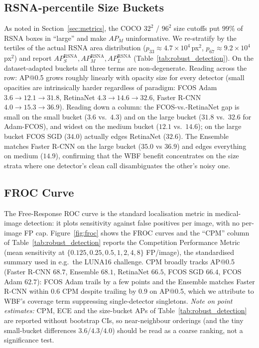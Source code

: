 \documentclass[11pt,a4paper]{article}
\begin{document}
\subsection{RSNA-percentile Size Buckets}
As noted in Section~\ref{sec:metrics}, the COCO $32^2$ / $96^2$ size cutoffs put $99\%$ of RSNA boxes in ``large'' and make $AP_M$ uninformative. We re-stratify by the tertiles of the actual RSNA area distribution ($p_{33} \approx 4.7 \times 10^4$\,px$^2$, $p_{67} \approx 9.2 \times 10^4$\,px$^2$) and report $AP_S^{\text{RSNA}}, AP_M^{\text{RSNA}}, AP_L^{\text{RSNA}}$ (Table~\ref{tab:robust_detection}). On the dataset-adapted buckets all three terms are non-degenerate. Reading across the row: AP@0.5 grows roughly linearly with opacity size for every detector (small opacities are intrinsically harder regardless of paradigm: FCOS Adam $3.6 \rightarrow 12.1 \rightarrow 31.8$, RetinaNet $4.3 \rightarrow 14.6 \rightarrow 32.6$, Faster R-CNN $4.0 \rightarrow 15.3 \rightarrow 36.9$). Reading down a column: the FCOS-vs.-RetinaNet gap is small on the small bucket ($3.6$ vs.\ $4.3$) and on the large bucket ($31.8$ vs.\ $32.6$ for Adam-FCOS), and widest on the medium bucket ($12.1$ vs.\ $14.6$); on the large bucket FCOS SGD ($34.0$) actually edges RetinaNet ($32.6$). The Ensemble matches Faster R-CNN on the large bucket ($35.0$ vs $36.9$) and edges everything on medium ($14.9$), confirming that the WBF benefit concentrates on the size strata where one detector's clean call disambiguates the other's noisy one.

\subsection{FROC Curve}
The Free-Response ROC curve is the standard localisation metric in medical-image detection: it plots sensitivity against false positives per image, with no per-image FP cap. Figure~\ref{fig:froc} shows the FROC curves and the ``CPM'' column of Table~\ref{tab:robust_detection} reports the Competition Performance Metric (mean sensitivity at $\{0.125, 0.25, 0.5, 1, 2, 4, 8\}$ FP/image), the standardised summary used in e.g.\ the LUNA16 challenge. CPM broadly tracks AP@0.5 (Faster R-CNN $68.7$, Ensemble $68.1$, RetinaNet $66.5$, FCOS SGD $66.4$, FCOS Adam $62.7$): FCOS Adam trails by a few points and the Ensemble matches Faster R-CNN within $0.6$ CPM despite trailing by $0.9$ on AP@0.5, which we attribute to WBF's coverage term suppressing single-detector singletons. \emph{Note on point estimates:} CPM, ECE and the size-bucket APs of Table~\ref{tab:robust_detection} are reported without bootstrap CIs, so near-neighbour orderings (and the tiny small-bucket differences $3.6$/$4.3$/$4.0$) should be read as a coarse ranking, not a significance test.
\end{document}
